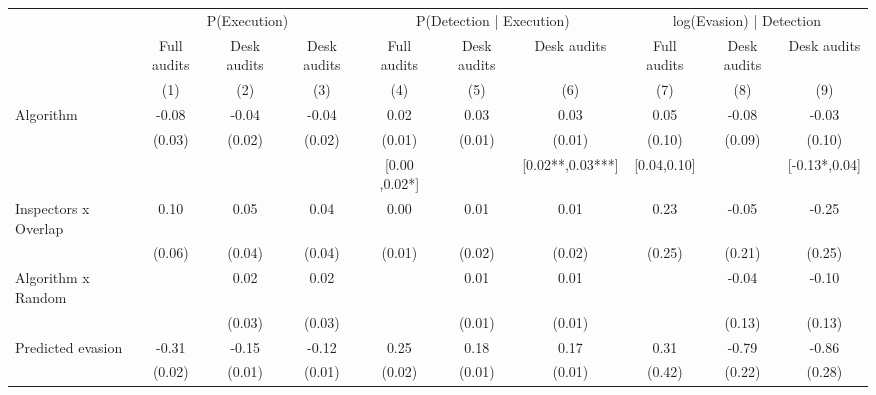 \begin{tabular}{lccc|ccc|ccc} \toprule
\multicolumn{1}{l}{} & \multicolumn{3}{c}{P(Execution)} & \multicolumn{3}{c}{P(Detection | Execution)} & \multicolumn{3}{c}{log(Evasion) | Detection} \\\cmidrule(lr){2-4}\cmidrule(lr){5-7}\cmidrule(lr){8-10} \multicolumn{1}{l}{} & Full audits & Desk audits & Desk audits & Full audits & Desk audits & Desk audits & Full audits & Desk audits & Desk audits \\ \multicolumn{1}{l}{} & (1) & (2) & (3) & (4) & (5) & (6) & (7) & (8) & (9) \\ \midrule
Algorithm   &       -0.08\sym{***}&       -0.04\sym{***}&       -0.04\sym{**} &        0.02\sym{**} &        0.03\sym{***}&        0.03\sym{***}&        0.05         &       -0.08         &       -0.03         \\
            &      (0.03)         &      (0.02)         &      (0.02)         &      (0.01)         &      (0.01)         &      (0.01)         &      (0.10)         &      (0.09)         &      (0.10)         \\
\addlinespace
 & & & & [0.00 ,0.02*] & & [0.02**,0.03***] & [0.04,0.10] & & [-0.13*,0.04] \\  Inspectors x Overlap&        0.10         &        0.05         &        0.04         &        0.00         &        0.01         &        0.01         &        0.23         &       -0.05         &       -0.25         \\
            &      (0.06)         &      (0.04)         &      (0.04)         &      (0.01)         &      (0.02)         &      (0.02)         &      (0.25)         &      (0.21)         &      (0.25)         \\
\addlinespace
Algorithm x Random&                     &        0.02         &        0.02         &                     &        0.01         &        0.01         &                     &       -0.04         &       -0.10         \\
            &                     &      (0.03)         &      (0.03)         &                     &      (0.01)         &      (0.01)         &                     &      (0.13)         &      (0.13)         \\
\addlinespace
Predicted evasion&       -0.31\sym{***}&       -0.15\sym{***}&       -0.12\sym{***}&        0.25\sym{***}&        0.18\sym{***}&        0.17\sym{***}&        0.31         &       -0.79\sym{***}&       -0.86\sym{***}\\
            &      (0.02)         &      (0.01)         &      (0.01)         &      (0.02)         &      (0.01)         &      (0.01)         &      (0.42)         &      (0.22)         &      (0.28)         \\

\end{tabular}
